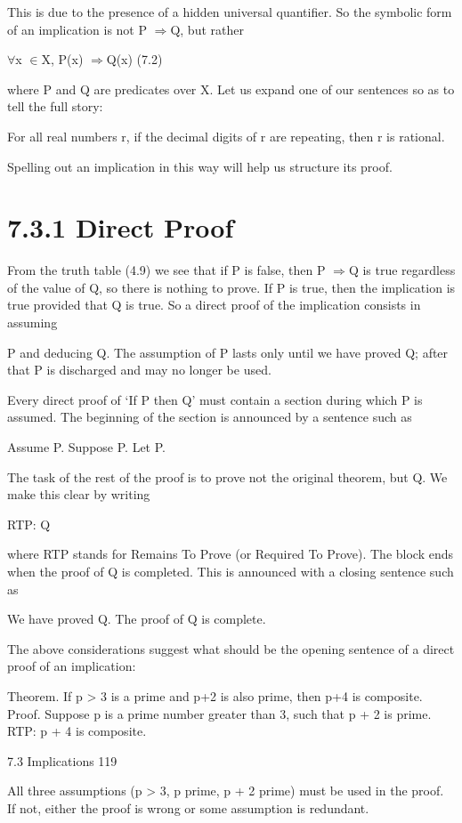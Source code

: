 \documentclass[11pt]{article}
\theoremstyle{plain}
\theoremstyle{definition}
\begin{document}
This is due to the presence of a hidden universal quantifier. So the symbolic form of an implication is not P $\Rightarrow$Q, but rather

$\forall$x $\in$X, P(x) $\Rightarrow$Q(x) (7.2)

where P and Q are predicates over X. Let us expand one of our sentences so as to tell the full story:

For all real numbers r, if the decimal digits of r are repeating, then r is rational.

Spelling out an implication in this way will help us structure its proof.

\section{7.3.1 Direct Proof}

From the truth table (4.9) we see that if P is false, then P $\Rightarrow$Q is true regardless of the value of Q, so there is nothing to prove. If P is true, then the implication is true provided that Q is true. So a direct proof of the implication consists in assuming

P and deducing Q. The assumption of P lasts only until we have proved Q; after that P is discharged and may no longer be used.

Every direct proof of `If P then Q' must contain a section during which P is assumed. The beginning of the section is announced by a sentence such as

Assume P. Suppose P. Let P.

The task of the rest of the proof is to prove not the original theorem, but Q. We make this clear by writing

RTP: Q

where RTP stands for Remains To Prove (or Required To Prove). The block ends when the proof of Q is completed. This is announced with a closing sentence such as

We have proved Q. The proof of Q is complete.

The above considerations suggest what should be the opening sentence of a direct proof of an implication:

Theorem. If p > 3 is a prime and p+2 is also prime, then p+4 is composite. Proof. Suppose p is a prime number greater than 3, such that p + 2 is prime. RTP: p + 4 is composite.

7.3 Implications 119

All three assumptions (p > 3, p prime, p + 2 prime) must be used in the proof. If not, either the proof is wrong or some assumption is redundant.
\end{document}
